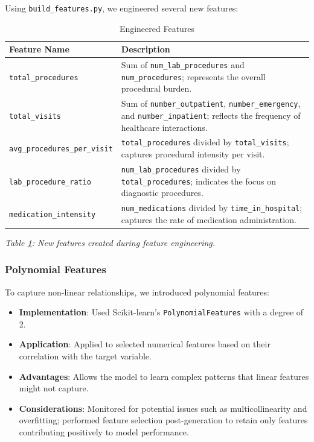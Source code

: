 \documentclass{article}
\begin{document}
Using \texttt{build\_features.py}, we engineered several new features:

\begin{table}[H]
\centering
\caption{Engineered Features}
\label{tab:engineered_features}
\begin{tabular}{p{4cm} p{10cm}}
\toprule
\textbf{Feature Name} & \textbf{Description} \\
\midrule
\texttt{total\_procedures} & Sum of \texttt{num\_lab\_procedures} and \texttt{num\_procedures}; represents the overall procedural burden. \\
\texttt{total\_visits} & Sum of \texttt{number\_outpatient}, \texttt{number\_emergency}, and \texttt{number\_inpatient}; reflects the frequency of healthcare interactions. \\
\texttt{avg\_procedures\_per\_visit} & \texttt{total\_procedures} divided by \texttt{total\_visits}; captures procedural intensity per visit. \\
\texttt{lab\_procedure\_ratio} & \texttt{num\_lab\_procedures} divided by \texttt{total\_procedures}; indicates the focus on diagnostic procedures. \\
\texttt{medication\_intensity} & \texttt{num\_medications} divided by \texttt{time\_in\_hospital}; captures the rate of medication administration. \\
\bottomrule
\end{tabular}
\end{table}

\textit{Table \ref{tab:engineered_features}: New features created during feature engineering.}

\subsubsection{Polynomial Features}

To capture non-linear relationships, we introduced polynomial features:

\begin{itemize}[leftmargin=*]
    \item \textbf{Implementation}: Used Scikit-learn's \texttt{PolynomialFeatures} with a degree of 2.
    \item \textbf{Application}: Applied to selected numerical features based on their correlation with the target variable.
    \item \textbf{Advantages}: Allows the model to learn complex patterns that linear features might not capture.
    \item \textbf{Considerations}: Monitored for potential issues such as multicollinearity and overfitting; performed feature selection post-generation to retain only features contributing positively to model performance.
\end{itemize}
\end{document}
